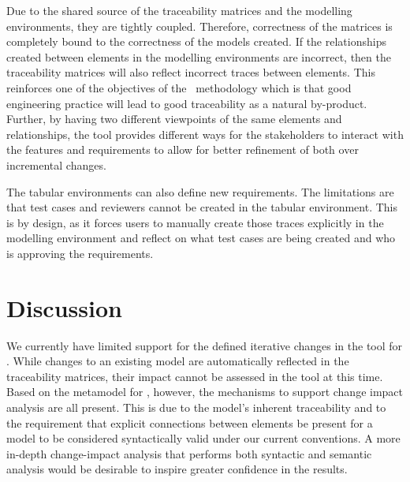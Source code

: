 Due to the shared source of the traceability matrices and the modelling environments, they are tightly coupled. Therefore, correctness of the matrices is completely bound to the correctness of the models created. If the relationships created between elements in the modelling environments are incorrect, then the traceability matrices will also reflect incorrect traces between elements. This reinforces one of the objectives of the \tool\ methodology which is that good engineering practice will lead to good traceability as a natural by-product. Further, by having two different viewpoints of the same elements and relationships, the tool provides different ways for the stakeholders to interact with the features and requirements to allow for better refinement of both over incremental changes.

The tabular environments can also define new requirements. The limitations are that test cases and reviewers cannot be created in the tabular environment. This is by design, as it forces users to manually create those traces explicitly in the modelling environment and reflect on what test cases are being created and who is approving the requirements.

\section{Discussion}
\label{sec:Eval-Discussion}

We currently have limited support for the defined iterative changes in the tool for \tool. While changes to an existing model are automatically reflected in the traceability matrices, their impact cannot be assessed in the tool at this time. Based on the metamodel for \tool, however, the mechanisms to support change impact analysis are all present. This is due to the model's inherent traceability and to the requirement that explicit connections between elements be present for a model to be considered syntactically valid under our current conventions. A more in-depth change-impact analysis that performs both syntactic and semantic analysis would be desirable to inspire greater confidence in the results.

